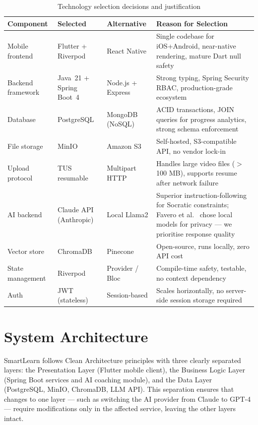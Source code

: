 \documentclass[12pt,a4paper]{report}
\begin{document}
\begin{table}[htbp]
\centering
\caption{Technology selection decisions and justification}
\label{tab:tech}
\footnotesize
\renewcommand{\arraystretch}{1.3}
\begin{tabularx}{\textwidth}{L{2.6cm} L{2.6cm} L{2.4cm} X}
\toprule
\textbf{Component} & \textbf{Selected} & \textbf{Alternative} & \textbf{Reason for Selection}\\
\midrule
Mobile frontend & Flutter + Riverpod & React Native &
Single codebase for iOS+Android, near-native rendering, mature Dart null safety\\
Backend framework & Java~21 + Spring Boot~4 & Node.js + Express &
Strong typing, Spring Security RBAC, production-grade ecosystem\\
Database & PostgreSQL & MongoDB (NoSQL) &
ACID transactions, JOIN queries for progress analytics, strong schema enforcement\\
File storage & MinIO & Amazon S3 &
Self-hosted, S3-compatible API, no vendor lock-in\\
Upload protocol & TUS resumable & Multipart HTTP &
Handles large video files ($>$100 MB), supports resume after network failure\\
AI backend & Claude API (Anthropic) & Local Llama2 &
Superior instruction-following for Socratic constraints; Favero et al.~\cite{ref7} chose
local models for privacy --- we prioritise response quality\\
Vector store & ChromaDB & Pinecone &
Open-source, runs locally, zero API cost\\
State management & Riverpod & Provider / Bloc &
Compile-time safety, testable, no context dependency\\
Auth & JWT (stateless) & Session-based &
Scales horizontally, no server-side session storage required\\
\bottomrule
\end{tabularx}
\end{table}

\section{System Architecture}

SmartLearn follows Clean Architecture principles with three clearly separated layers:
the Presentation Layer (Flutter mobile client), the Business Logic Layer (Spring Boot
services and AI coaching module), and the Data Layer (PostgreSQL, MinIO, ChromaDB, LLM
API). This separation ensures that changes to one layer --- such as switching the AI
provider from Claude to GPT-4 --- require modifications only in the affected service,
leaving the other layers intact.
\end{document}
